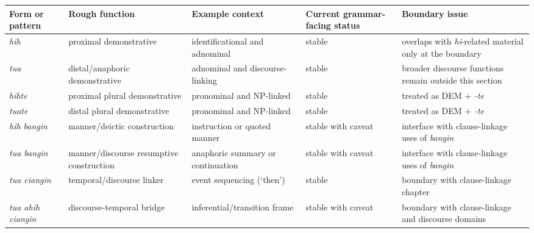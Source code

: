 \documentclass[
  11pt,
  a4paper,
]{article}
\newcounter{none} %
\newcommand{\tdim}[1]{\textit{#1}}
\newcommand{\glossquote}[1]{`#1'}
\begin{document}
{\def\LTcaptype{none} %
\begin{longtable}[]{@{}
  >{\raggedright\arraybackslash}p{}
  >{\raggedright\arraybackslash}p{}
  >{\raggedright\arraybackslash}p{}
  >{\raggedright\arraybackslash}p{}
  >{\raggedright\arraybackslash}p{}@{}}
\toprule\noalign{}
\begin{minipage}[b]{\linewidth}\raggedright
Form or pattern
\end{minipage} & \begin{minipage}[b]{\linewidth}\raggedright
Rough function
\end{minipage} & \begin{minipage}[b]{\linewidth}\raggedright
Example context
\end{minipage} & \begin{minipage}[b]{\linewidth}\raggedright
Current grammar-facing status
\end{minipage} & \begin{minipage}[b]{\linewidth}\raggedright
Boundary issue
\end{minipage} \\
\midrule\noalign{}
\endhead
\bottomrule\noalign{}
\endlastfoot
\tdim{hih} & proximal demonstrative & identificational and adnominal &
stable & overlaps with \tdim{hi}-related material only at the
boundary \\
\tdim{tua} & distal/anaphoric demonstrative & adnominal and
discourse-linking & stable & broader discourse functions remain outside
this section \\
\tdim{hihte} & proximal plural demonstrative & pronominal and NP-linked
& stable & treated as DEM + \tdim{-te} \\
\tdim{tuate} & distal plural demonstrative & pronominal and NP-linked &
stable & treated as DEM + \tdim{-te} \\
\tdim{hih bangin} & manner/deictic construction & instruction or quoted
manner & stable with caveat & interface with clause-linkage uses of
\tdim{bangin} \\
\tdim{tua bangin} & manner/discourse resumptive construction & anaphoric
summary or continuation & stable with caveat & interface with
clause-linkage uses of \tdim{bangin} \\
\tdim{tua ciangin} & temporal/discourse linker & event sequencing
(\glossquote{then}) & stable & boundary with clause-linkage chapter \\
\tdim{tua ahih ciangin} & discourse-temporal bridge &
inferential/transition frame & stable with caveat & boundary with
clause-linkage and discourse domains \\
\end{longtable}
}
\end{document}
